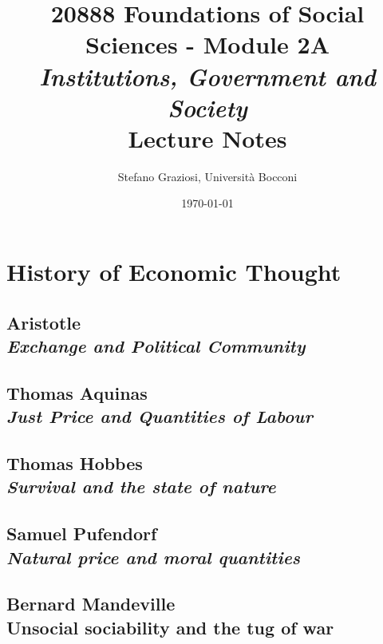 \documentclass[dvipsnames,12pt]{book}
\title{20888 Foundations of Social Sciences - Module 2A \\[0.2cm] {\Large \textit{Institutions, Government and Society}} \\[1cm] \textbf{Lecture Notes}}
\author{Stefano Graziosi, Università Bocconi}
\date{\today}
\begin{document}
\maketitle

\tableofcontents

\part{History of Economic Thought}

    \chapter[Exchange and Political Community]{Aristotle \\[0.6cm] \textit{Exchange and Political Community}}

        

    \chapter[Just Price and Quantities of Labour]{Thomas Aquinas \\[0.6cm] \textit{Just Price and Quantities of Labour}}

        

    \chapter[Survival and the state of nature]{Thomas Hobbes \\[0.6cm] \textit{Survival and the state of nature}}

        

    \chapter[Natural price and moral quantities]{Samuel Pufendorf \\[0.6cm] \textit{Natural price and moral quantities}}

        

    \chapter[Unsocial sociability and the tug of war]{Bernard Mandeville \\[0.6cm] Unsocial sociability and the tug of war}
\end{document}

